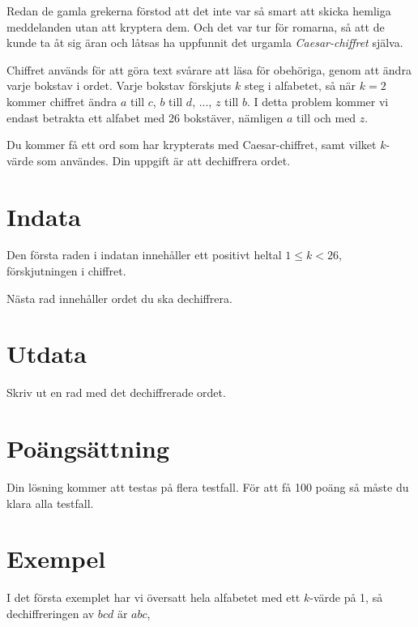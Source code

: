 
Redan de gamla grekerna förstod att det inte var så smart att skicka hemliga meddelanden utan att kryptera dem.
Och det var tur för romarna, så att de kunde ta åt sig äran och låtsas ha uppfunnit det urgamla \emph{Caesar-chiffret} själva.

Chiffret används för att göra text svårare att läsa för obehöriga, genom att ändra varje bokstav i ordet.
Varje bokstav förskjuts $k$ steg i alfabetet, så när $k = 2$ kommer chiffret ändra $a$ till $c$, $b$ till
$d$, ..., $z $ till $b$. I detta problem kommer vi endast betrakta ett alfabet med 26 bokstäver, nämligen $a$ till och med $z$.

Du kommer få ett ord som har krypterats med Caesar-chiffret, samt vilket $k$-värde som användes. Din uppgift är att dechiffrera ordet.

\section*{Indata}
Den första raden i indatan innehåller ett positivt heltal $1 \le k < 26$, förskjutningen i chiffret.

Nästa rad innehåller ordet du ska dechiffrera.

\section*{Utdata}
Skriv ut en rad med det dechiffrerade ordet.

\section*{Poängsättning}
Din lösning kommer att testas på flera testfall. För att få 100 poäng så måste du klara alla testfall.

\section*{Exempel}
I det första exemplet har vi översatt hela alfabetet med ett $k$-värde på 1, så dechiffreringen av $bcd$ är $abc$,
